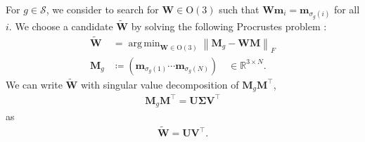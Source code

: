 \documentclass[a4paper, 11pt]{article}
\theoremstyle{definition}
\newcommand{\norm}[1]{\left\lVert#1\right\rVert}
\DeclareMathOperator*{\argmin}{arg\,min}
\begin{document}
For $g \in \mathcal{S}$, we consider to search for $\bm{W} \in \mathrm{O}(3)$ such that $\bm{W} \bm{m}_{i} = \bm{m}_{\sigma_{g}(i)}$ for all $i$.
We choose a candidate $\tilde{\bm{W}}$ by solving the following Procrustes problem \cite{10.1093/acprof:oso/9780198510581.001.0001}:
\begin{align}
  \tilde{\bm{W}}
    &=\argmin_{ \bm{W} \in \mathrm{O}(3) } \norm{ \bm{M}_{g} - \bm{W} \bm{M} }_{F} \\
  \bm{M}_{g}
    &\coloneqq \left( \bm{m}_{\sigma_{g}(1)} \cdots \bm{m}_{\sigma_{g}(N)} \right)
    \quad \in \mathbb{R}^{3 \times N}.
\end{align}
We can write $\tilde{\bm{W}}$ with singular value decomposition of $\bm{M}_{g} \bm{M}^{\top}$,
\begin{align}
  \bm{M}_{g} \bm{M}^{\top}
    = \bm{U} \bm{\Sigma} \bm{V}^{\top}
\end{align}
as
\begin{align}
  \tilde{\bm{W}} = \bm{U} \bm{V}^{\top}.
\end{align}




\end{document}
